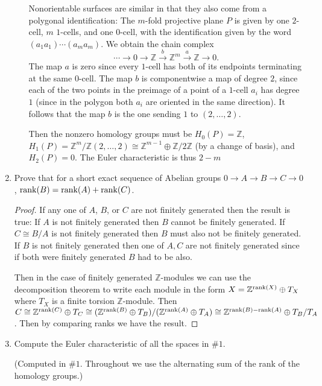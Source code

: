 \documentclass[11pt]{article}
\begin{document}
\begin{enumerate}
\begin{enumerate}
        Nonorientable surfaces are similar in that they also come from a polygonal identification: The $m$-fold projective plane $P$ is given by one $2$-cell, $m$ $1$-cells, and one $0$-cell, with the identification given by the word $(a_1a_1)\cdots (a_ma_m)$. We obtain the chain complex \[\cdots \to 0\to \mathbb{Z}\xrightarrow{b}\mathbb{Z}^m\xrightarrow{a}\mathbb{Z}\to 0.\] The map $a$ is zero since every $1$-cell has both of its endpoints terminating at the same $0$-cell. The map $b$ is componentwise a map of degree $2$, since each of the two points in the preimage of a point of a $1$-cell $a_i$ has degree $1$ (since in the polygon both $a_i$ are oriented in the same direction). It follows that the map $b$ is the one sending $1$ to $(2,\dots,2)$.

        Then the nonzero homology groups must be $H_0(P) = \mathbb{Z}$, $H_1(P) = \mathbb{Z}^m/\mathbb{Z}(2,\dots,2)\cong \mathbb{Z}^{m-1}\oplus\mathbb{Z}/2\mathbb{Z}$ (by a change of basis), and $H_2(P) = 0$. The Euler characteristic is thus $2-m$
    \end{enumerate}
    \item Prove that for a short exact sequence of Abelian groups $0\to A\to B\to C\to 0$, $\rank(B) = \rank(A) + \rank(C)$. \begin{proof}
        If any one of $A$, $B$, or $C$ are not finitely generated then the result is true: If $A$ is not finitely generated then $B$ cannot be finitely generated. If $C\cong B/A$ is not finitely generated then $B$ must also not be finitely generated. If $B$ is not finitely generated then one of $A,C$ are not finitely generated since if both were finitely generated $B$ had to be also.

        Then in the case of finitely generated $\mathbb{Z}$-modules we can use the decomposition theorem to write each module in the form $X = \mathbb{Z}^{\rank(X)}\oplus T_X$ where $T_X$ is a finite torsion $\mathbb{Z}$-module. Then $C\cong \mathbb{Z}^{\rank(C)}\oplus T_C\cong (\mathbb{Z}^{\rank(B)}\oplus T_B)/(\mathbb{Z}^{\rank(A)}\oplus T_A)\cong \mathbb{Z}^{\rank(B)-\rank(A)}\oplus T_B/T_A$. Then by comparing ranks we have the result.
    \end{proof}
    \item Compute the Euler characteristic of all the spaces in \#$1$. 
    
    (Computed in \#$1$. Throughout we use the alternating sum of the rank of the homology groups.)
\end{enumerate}
\end{document}
